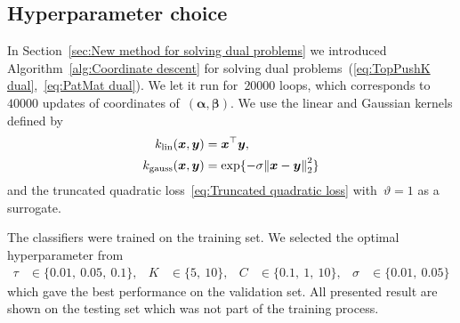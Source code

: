 \subsection{Hyperparameter choice}

In Section~\ref{sec:New method for solving dual problems} we introduced Algorithm~\ref{alg:Coordinate descent} for solving dual problems~(\ref{eq:TopPushK dual},~\ref{eq:PatMat dual}). We let it run for~$20000$ \repeatloop loops, which corresponds to~$40000$ updates of coordinates of~$(\bm{\alpha},\bm{\beta})$. We use the linear and Gaussian kernels defined by
\begin{align}
  k_{\textrm{lin}}(\bm{x}, \bm{y})   & = \bm{x}^{\top} \bm{y}, \label{eq:Linear kernel} \\
  k_{\textrm{gauss}}(\bm{x}, \bm{y}) & = \exp\{-\sigma \norm{\bm{x} - \bm{y}}_2^2\} \label{eq:Gaussian kernel}
\end{align}
and the truncated quadratic loss~\eqref{eq:Truncated quadratic loss} with~$\vartheta = 1$ as a surrogate. 

The classifiers were trained on the training set. We selected the optimal hyperparameter from
\begin{equation*}
  \begin{aligned}
    \tau   & \in \{0.01,\ 0.05,\ 0.1\}, &
    K      & \in \{5,\ 10\}, &
    C      & \in \{0.1,\ 1,\ 10\}, &
    \sigma & \in \{0.01,\ 0.05\} 
  \end{aligned}
\end{equation*}
which gave the best performance on the validation set. All presented result are shown on the testing set which was not part of the training process.

